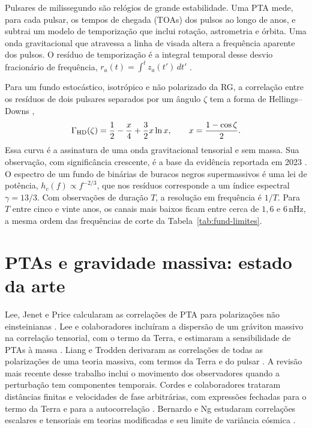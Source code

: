 Pulsares de milissegundo são relógios de grande estabilidade. Uma PTA
mede, para cada pulsar, os tempos de chegada (TOAs) dos pulsos ao longo
de anos, e subtrai um modelo de temporização que inclui rotação,
astrometria e órbita. Uma onda gravitacional que atravessa a linha de
visada altera a frequência aparente dos pulsos. O resíduo de
temporização é a integral temporal desse desvio fracionário de
frequência, $r_a(t)=\int^t z_a(t')\,dt'$ \autocite{detweiler1979}.

Para um fundo estocástico, isotrópico e não polarizado da RG, a
correlação entre os resíduos de dois pulsares separados por um ângulo
$\zeta$ tem a forma de Hellings--Downs \autocite{hellings1983},
\begin{equation}
 \Gamma_{\rm HD}(\zeta)=\frac12-\frac{x}{4}+\frac32x\ln x,
 \qquad x=\frac{1-\cos\zeta}{2}.
 \label{eq:fund-hd}
\end{equation}
Essa curva é a assinatura de uma onda gravitacional tensorial e sem
massa. Sua observação, com significância crescente, é a base da
evidência reportada em 2023 \autocite{agazie2023}. O espectro de um fundo
de binárias de buracos negros supermassivos é uma lei de potência,
$h_c(f)\propto f^{-2/3}$, que nos resíduos corresponde a um índice
espectral $\gamma=13/3$. Com observações de duração $T$, a resolução em
frequência é $1/T$. Para $T$ entre cinco e vinte anos, os canais mais
baixos ficam entre cerca de $1,6$ e $6\,\mathrm{nHz}$, a mesma ordem das
frequências de corte da Tabela~\ref{tab:fund-limites}.

\section{PTAs e gravidade massiva: estado da arte}

Lee, Jenet e Price calcularam as correlações de PTA para polarizações
não einsteinianas \autocite{lee2008}. Lee e colaboradores incluíram a
dispersão de um gráviton massivo na correlação tensorial, com o termo da
Terra, e estimaram a sensibilidade de PTAs à massa \autocite{lee2010}.
Liang e Trodden derivaram as correlações de todas as polarizações de
uma teoria massiva, com termos da Terra e do pulsar
\autocite{liang2021}. A revisão mais recente desse trabalho inclui o
movimento dos observadores quando a perturbação tem componentes
temporais. Cordes e colaboradores trataram distâncias finitas e
velocidades de fase arbitrárias, com expressões fechadas para o termo
da Terra e para a autocorrelação \autocite{cordes2025}. Bernardo e Ng
estudaram correlações escalares e tensoriais em teorias modificadas e
seu limite de variância cósmica \autocite{bernardo2024}.

